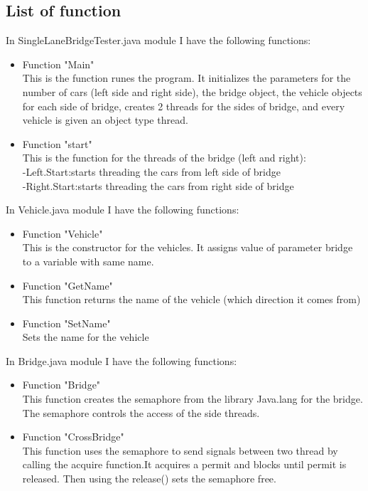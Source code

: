 \documentclass{article}
\begin{document}
\subsection {List of function}
In SingleLaneBridgeTester.java module I have the following functions:
\begin{itemize}

 \item Function "Main"\\
\indent\indent This is the function runes the program. It initializes the parameters for the number of cars (left side and right side), the bridge object, the vehicle objects for each side of bridge, creates 2 threads for the sides of bridge, and every vehicle is given an object type thread.
\item {Function "start"}\\
\indent\indent This is the function for the threads of the bridge (left and right): \\
\indent\indent -Left.Start:starts threading the cars from left side of bridge \\
\indent\indent -Right.Start:starts threading the cars from right side of bridge \\
\end{itemize}

In Vehicle.java module I have the following functions:
\begin{itemize}
\item {Function "Vehicle"}\\
\indent\indent This is the constructor for the vehicles. It assigns value of parameter bridge to a variable with same name.
\item {Function "GetName"}\\
\indent\indent This function returns the name of the vehicle (which direction it comes from)
\item{Function "SetName"}\\
\indent\indent Sets the name for the vehicle
\end{itemize}

In Bridge.java module I have the following functions:
\begin{itemize}
\item {Function "Bridge"}\\
\indent\indent This function creates the semaphore from the library Java.lang for the bridge. The semaphore controls the access of the side threads.
\item {Function "CrossBridge"}\\
\indent\indent This function uses the semaphore to send signals between two thread by calling the acquire function.It acquires a permit and blocks until permit is released. Then using the release() sets the semaphore free.
\end{itemize}
\end{document}
